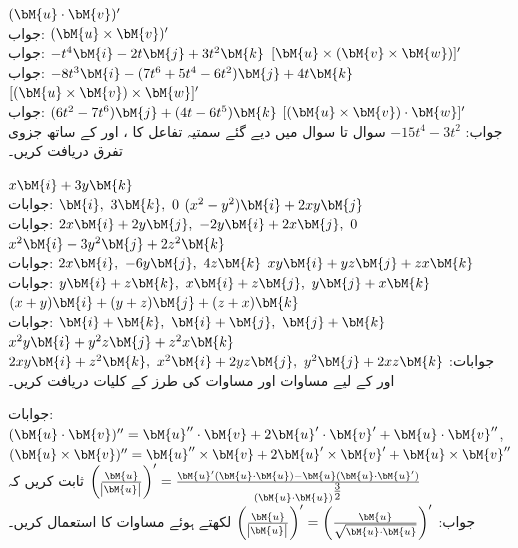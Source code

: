 \quad
$(\bM{u}\cdot \bM{v})'$\\
جواب:
\quad
$(\bM{u}\times \bM{v})'$\\
جواب:
$-t^4\bM{i}-2t\bM{j}+3t^2\bM{k}$
\quad
$[\bM{u}\times (\bM{v}\times \bM{w})]'$\\
جواب:
$-8t^3\bM{i}-(7t^6+5t^4-6t^2)\bM{j}+4t\bM{k}$
\quad
$[(\bM{u}\times \bM{v})\times \bM{w}]'$\\
جواب:
$(6t^2-7t^6)\bM{j}+(4t-6t^5)\bM{k}$
\quad
$[(\bM{u}\times \bM{v})\cdot\bM{w}]'$\\
جواب:
$-15t^4-3t^2$
سوال  تا سوال  میں دیے گئے سمتیہ  تفاعل  کا  ،   اور  کے ساتھ جزوی تفرق دریافت کریں۔

\quad
$x\bM{i}+3y\bM{k}$\\
جوابات:
$\bM{i},\,\, 3\bM{k},\,\, 0$
\quad
$(x^2-y^2)\bM{i}+2xy\bM{j}$\\
جوابات:
$2x\bM{i}+2y\bM{j},\,\, -2y\bM{i}+2x\bM{j},\,\, 0$
\quad
$x^2\bM{i}-3y^2\bM{j}+2z^2\bM{k}$\\
جوابات:
$2x\bM{i},\,\, -6y\bM{j},\,\,4z\bM{k}$
\quad
$xy\bM{i}+yz\bM{j}+zx\bM{k}$\\
جوابات:
$y\bM{i}+z\bM{k},\,\, x\bM{i}+z\bM{j},\,\,y\bM{j}+x\bM{k}$
\quad
$(x+y)\bM{i}+(y+z)\bM{j}+(z+x)\bM{k}$\\
جوابات:
$\bM{i}+\bM{k},\,\, \bM{i}+\bM{j},\,\,\bM{j}+\bM{k}$
\quad
$x^2y\bM{i}+y^2z\bM{j}+z^2x\bM{k}$\\
جوابات:
$2xy\bM{i}+z^2\bM{k},\,\, x^2\bM{i}+2yz\bM{j},\,\,y^2\bM{j}+2xz\bM{k}$
 اور  کے لیے مساوات  اور مساوات  کی طرز کے کلیات دریافت کریں۔

جوابات:
$(\bM{u}\cdot \bM{v})''=\bM{u}''\cdot \bM{v}+2\bM{u}'\cdot \bM{v}'+\bM{u}\cdot \bM{v}'' $, \\  $(\bM{u}\times \bM{v})''=\bM{u}''\times \bM{v}+2\bM{u}'\times \bM{v}'+\bM{u}\times \bM{v}''$
ثابت کریں کہ
$\left(\tfrac{\bM{u}}{\abs{\bM{u}}}\right)'=\tfrac{\bM{u}'(\bM{u}\cdot \bM{u})-\bM{u}(\bM{u}\cdot \bM{u}')}{(\bM{u}\cdot \bM{u})^{\tfrac{3}{2}}}$\\
جواب:
$\left(\tfrac{\bM{u}}{\abs{\bM{u}}}\right)'=\left(\tfrac{\bM{u}}{\sqrt{\bM{u}\cdot \bM{u}}}\right)'$
 لکھتے ہوئے  مساوات  کا استعمال کریں۔

